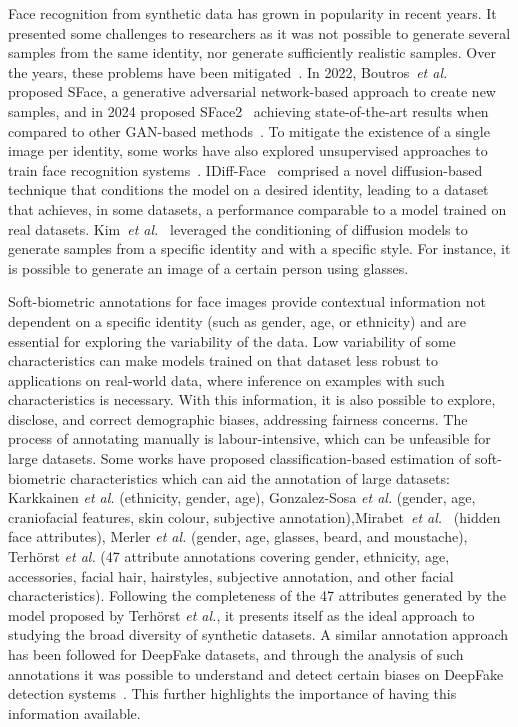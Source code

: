 \documentclass[a4paper, 10pt, conference]{ieeeconf}      %
\begin{document}
Face recognition from synthetic data has grown in popularity in recent years. It presented some challenges to researchers as it was not possible to generate several samples from the same identity, nor generate sufficiently realistic samples. Over the years, these problems have been mitigated~\cite{deandres2024frcsyn}. In 2022, Boutros~\textit{et al.}~\cite{boutros2022sface} proposed SFace, a generative adversarial network-based approach to create new samples, and in 2024 proposed SFace2~\cite{boutros2024sface2} achieving state-of-the-art results when compared to other GAN-based methods~\cite{kolf2023identity,qiu2021synface}. To mitigate the existence of a single image per identity, some works have also explored unsupervised approaches to train face recognition systems~\cite{boutros2023unsupervised}. IDiff-Face~\cite{boutros2023idiff} comprised a novel diffusion-based technique that conditions the model on a desired identity, leading to a dataset that achieves, in some datasets, a performance comparable to a model trained on real datasets. Kim~\textit{et al.}~\cite{kim2023dcface} leveraged the conditioning of diffusion models to generate samples from a specific identity and with a specific style. For instance, it is possible to generate an image of a certain person using glasses.  

Soft-biometric annotations for face images provide contextual information not dependent on a specific identity (such as gender, age, or ethnicity) and are essential for exploring the variability of the data. Low variability of some characteristics can make models trained on that dataset less robust to applications on real-world data, where inference on examples with such characteristics is necessary.
With this information, it is also possible to explore, disclose, and correct demographic biases, addressing fairness concerns. The process of annotating manually is labour-intensive, which can be unfeasible for large datasets. Some works have proposed classification-based estimation of soft-biometric characteristics which can aid the annotation of large datasets: Karkkainen  \textit{et al. } \cite{karkkainen2021fairface} (ethnicity, gender, age), Gonzalez-Sosa \textit{et al. } \cite{Gonzalez2018Facial} (gender, age, craniofacial features, skin colour, subjective annotation),Mirabet~\textit{et al.}~\cite{mirabet2023lvt} (hidden face attributes), Merler \textit{et al. } \cite{merler2019diversity} (gender, age, glasses, beard, and moustache), Terhörst  \textit{et al.} \cite{terhorst2021maadface} (47 attribute annotations covering gender, ethnicity, age, accessories, facial hair, hairstyles, subjective annotation, and other facial characteristics). Following the completeness of the 47 attributes generated by the model proposed by Terhörst  \textit{et al.}, it presents itself as the ideal approach to studying the broad diversity of synthetic datasets. A similar annotation approach has been followed for DeepFake datasets, and through the analysis of such annotations it was possible to understand and detect certain biases on DeepFake detection systems~\cite{xu2022comprehensive}. This further highlights the importance of having this information available. 
\end{document}
